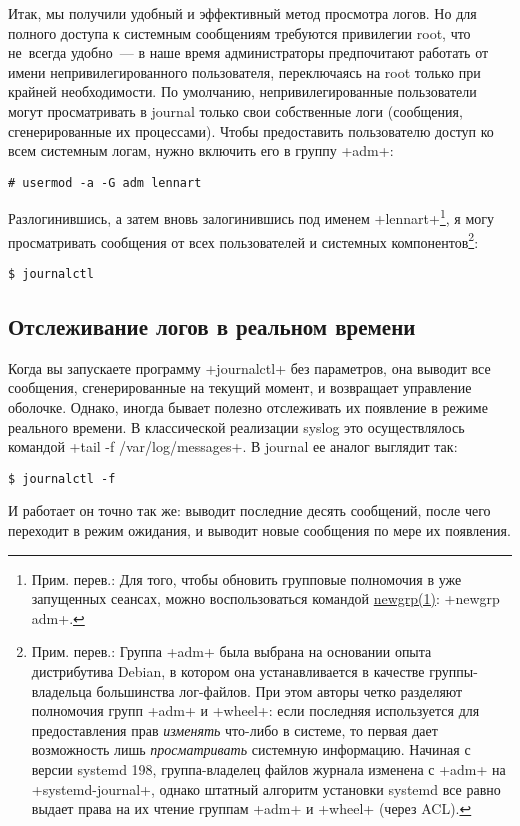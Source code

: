 \documentclass[10pt,oneside,a4paper]{article}
\begin{document}
Итак, мы получили удобный и эффективный метод просмотра логов. Но для полного
доступа к системным сообщениям требуются привилегии root, что не~всегда
удобно~--- в наше время администраторы предпочитают работать от имени
непривилегированного пользователя, переключаясь на root только при крайней
необходимости. По умолчанию, непривилегированные пользователи могут
просматривать в journal только свои собственные логи (сообщения, сгенерированные
их процессами). Чтобы предоставить пользователю доступ ко всем системным логам,
нужно включить его в группу +adm+:
\begin{Verbatim}
# usermod -a -G adm lennart
\end{Verbatim}
Разлогинившись, а затем вновь залогинившись под именем +lennart+\footnote{Прим.
перев.: Для того, чтобы обновить групповые полномочия в уже запущенных сеансах,
можно воспользоваться командой
\href{http://linux.die.net/man/1/newgrp}{newgrp(1)}: +newgrp adm+.}, я могу
просматривать сообщения от всех пользователей и системных
компонентов\footnote{Прим. перев.: Группа +adm+ была выбрана на основании опыта
дистрибутива Debian, в котором она устанавливается в качестве группы-владельца
большинства лог-файлов. При этом авторы четко разделяют полномочия групп +adm+ и
+wheel+: если последняя используется для предоставления прав \emph{изменять}
что-либо в системе, то первая дает возможность лишь \emph{просматривать}
системную информацию. Начиная с версии systemd 198, группа-владелец файлов
журнала изменена с +adm+ на +systemd-journal+, однако штатный алгоритм установки
systemd все равно выдает права на их чтение группам +adm+ и +wheel+ (через
ACL).}:
\begin{Verbatim}
$ journalctl
\end{Verbatim}

\subsection{Отслеживание логов в реальном времени}

Когда вы запускаете программу +journalctl+ без параметров, она выводит все
сообщения, сгенерированные на текущий момент, и возвращает управление оболочке.
Однако, иногда бывает полезно отслеживать их появление в режиме реального
времени. В классической реализации syslog это осуществлялось командой
+tail -f /var/log/messages+. В journal ее аналог выглядит так:
\begin{Verbatim}
$ journalctl -f
\end{Verbatim}
И работает он точно так же: выводит последние десять сообщений, после чего
переходит в режим ожидания, и выводит новые сообщения по мере их появления.
\end{document}
